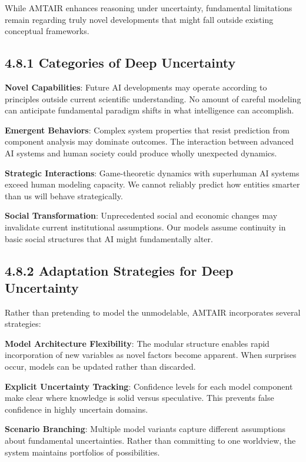 \documentclass[
  11pt,
  letterpaper,
  openany]{book}
\begin{document}
While AMTAIR enhances reasoning under uncertainty, fundamental
limitations remain regarding truly novel developments that might fall
outside existing conceptual frameworks.

\subsection{4.8.1 Categories of Deep
Uncertainty}\label{sec-uncertainty-categories}

\textbf{Novel Capabilities}: Future AI developments may operate
according to principles outside current scientific understanding. No
amount of careful modeling can anticipate fundamental paradigm shifts in
what intelligence can accomplish.

\textbf{Emergent Behaviors}: Complex system properties that resist
prediction from component analysis may dominate outcomes. The
interaction between advanced AI systems and human society could produce
wholly unexpected dynamics.

\textbf{Strategic Interactions}: Game-theoretic dynamics with superhuman
AI systems exceed human modeling capacity. We cannot reliably predict
how entities smarter than us will behave strategically.

\textbf{Social Transformation}: Unprecedented social and economic
changes may invalidate current institutional assumptions. Our models
assume continuity in basic social structures that AI might fundamentally
alter.

\subsection{4.8.2 Adaptation Strategies for Deep
Uncertainty}\label{sec-adaptation-strategies}

Rather than pretending to model the unmodelable, AMTAIR incorporates
several strategies:

\textbf{Model Architecture Flexibility}: The modular structure enables
rapid incorporation of new variables as novel factors become apparent.
When surprises occur, models can be updated rather than discarded.

\textbf{Explicit Uncertainty Tracking}: Confidence levels for each model
component make clear where knowledge is solid versus speculative. This
prevents false confidence in highly uncertain domains.

\textbf{Scenario Branching}: Multiple model variants capture different
assumptions about fundamental uncertainties. Rather than committing to
one worldview, the system maintains portfolios of possibilities.
\end{document}
